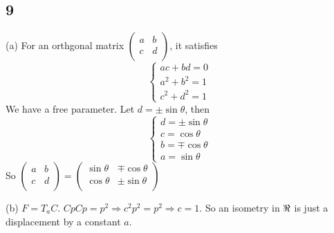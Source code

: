 \documentclass[12pt]{article}
\begin{document}
\subsection*{9}
(a) For an orthgonal matrix $\begin{pmatrix}
	a & b \\ c& d \\
\end{pmatrix}$, it satisfies 
$$\begin{cases}
	ac + bd = 0 \\
	a^2 + b^2 = 1 \\
	c^2 + d^2 = 1 
\end{cases}$$
We have a free parameter. Let $d = \pm \sin \theta$, then $$ \begin{cases}
	d = \pm \sin \theta \\
	c = \cos\theta\\
	b = \mp \cos\theta \\
	a = \sin\theta 
\end{cases} $$
So $\begin{pmatrix}
	a & b \\ c& d \\
\end{pmatrix} = \begin{pmatrix}
\sin\theta & \mp \cos\theta \\ \cos\theta&  \pm \sin\theta \\
\end{pmatrix}$

(b) $F = T_a C$. $Cp Cp = p^2 \Rightarrow c^2 p^2 = p^2 \Rightarrow c = 1$. So an isometry in $\real$ is just a displacement by a constant $a$.
\end{document}
